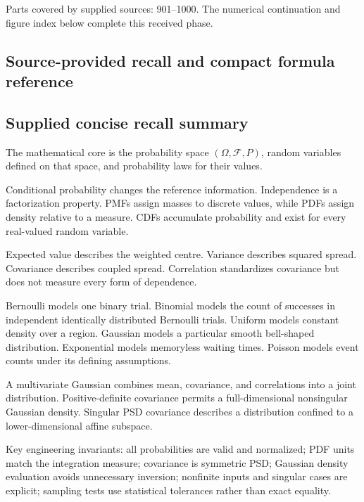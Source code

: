 Parts covered by supplied sources: 901--1000. The numerical continuation and figure index below complete this received phase.

\subsection{Source-provided recall and compact formula reference}\label{appendix-cb5af353ef77-source-provided-recall-and-compact-formula-reference}

\subsection{Supplied concise recall summary}\label{appendix-cb5af353ef77-supplied-concise-recall-summary}

The mathematical core is the probability space \((\Omega,\mathcal F,P)\), random variables defined on that space, and probability laws for their values.

Conditional probability changes the reference information. Independence is a factorization property. PMFs assign masses to discrete values, while PDFs assign density relative to a measure. CDFs accumulate probability and exist for every real-valued random variable.

Expected value describes the weighted centre. Variance describes squared spread. Covariance describes coupled spread. Correlation standardizes covariance but does not measure every form of dependence.

Bernoulli models one binary trial. Binomial models the count of successes in independent identically distributed Bernoulli trials. Uniform models constant density over a region. Gaussian models a particular smooth bell-shaped distribution. Exponential models memoryless waiting times. Poisson models event counts under its defining assumptions.

A multivariate Gaussian combines mean, covariance, and correlations into a joint distribution. Positive-definite covariance permits a full-dimensional nonsingular Gaussian density. Singular PSD covariance describes a distribution confined to a lower-dimensional affine subspace.

Key engineering invariants: all probabilities are valid and normalized; PDF units match the integration measure; covariance is symmetric PSD; Gaussian density evaluation avoids unnecessary inversion; nonfinite inputs and singular cases are explicit; sampling tests use statistical tolerances rather than exact equality.

